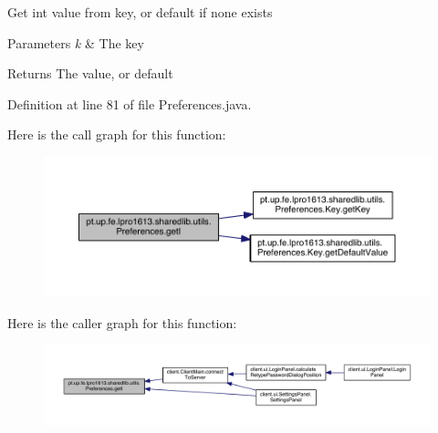 Get int value from key, or default if none exists


\begin{DoxyParams}{Parameters}
{\em k} & The key \\
\hline
\end{DoxyParams}
\begin{DoxyReturn}{Returns}
The value, or default 
\end{DoxyReturn}


Definition at line 81 of file Preferences.\+java.

Here is the call graph for this function\+:
\nopagebreak
\begin{figure}[H]
\begin{center}
\leavevmode
\includegraphics[width=350pt]{classpt_1_1up_1_1fe_1_1lpro1613_1_1sharedlib_1_1utils_1_1_preferences_a6b5169368a838aca6c6880826294aea7_cgraph}
\end{center}
\end{figure}
Here is the caller graph for this function\+:
\nopagebreak
\begin{figure}[H]
\begin{center}
\leavevmode
\includegraphics[width=350pt]{classpt_1_1up_1_1fe_1_1lpro1613_1_1sharedlib_1_1utils_1_1_preferences_a6b5169368a838aca6c6880826294aea7_icgraph}
\end{center}
\end{figure}
\hypertarget{classpt_1_1up_1_1fe_1_1lpro1613_1_1sharedlib_1_1utils_1_1_preferences_aada2e7f8fe94b6a7ef78cfb30637b982}{}\label{classpt_1_1up_1_1fe_1_1lpro1613_1_1sharedlib_1_1utils_1_1_preferences_aada2e7f8fe94b6a7ef78cfb30637b982} 
